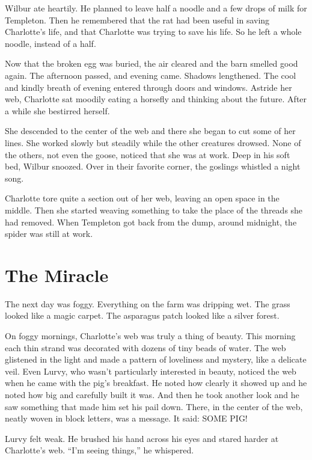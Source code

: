 \documentclass[a4paper, oneside]{book}
\begin{document}
Wilbur ate heartily. He planned to leave half a noodle and a
few drops of milk for Templeton. Then he remembered that the rat
had been useful in saving Charlotte's life, and that Charlotte was             
trying to save his life. So he left a whole noodle, instead of a half.

Now that the broken egg was buried, the air cleared and the
barn smelled good again. The afternoon passed, and evening came.
Shadows lengthened. The cool and kindly breath of evening
entered through doors and windows. Astride her web, Charlotte sat
moodily eating a horsefly and thinking about the future. After a
while she bestirred herself.

She descended to the center of the web and there she began to
cut some of her lines. She worked slowly but steadily while the
other creatures drowsed. None of the others, not even the goose,
noticed that she was at work. Deep in his soft bed, Wilbur snoozed.
Over in their favorite corner, the goslings whistled a night song.

Charlotte tore quite a section out of her web, leaving an open
space in the middle. Then she started weaving something to take
the place of the threads she had removed. When Templeton got
back from the dump, around midnight, the spider was still at work.

  \chapter{The Miracle}

The next day was foggy. Everything on the farm was dripping wet.
The grass looked like a magic carpet. The asparagus patch looked
like a silver forest.

On foggy mornings, Charlotte's web was truly a thing of beauty.
This morning each thin strand was decorated with dozens of tiny
beads of water. The web glistened in the light and made a pattern
of loveliness and mystery, like a delicate veil. Even Lurvy, who
wasn't particularly interested in beauty, noticed the web when he
came with the pig's breakfast. He noted how clearly it showed up
and he noted how big and carefully built it was. And then he took
another look and he saw something that made him set his pail
down. There, in the center of the web, neatly woven in block letters,
was a message. It said: SOME PIG!                                                

Lurvy felt weak. He brushed his hand across his eyes and
stared harder at Charlotte's web. ``I'm seeing things,'' he whispered.
\end{document}
